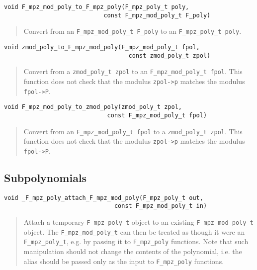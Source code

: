 \documentclass[a4paper,10pt]{article}
\newcommand{\code}{\lstinline}
\begin{document}
\begin{lstlisting}
void F_mpz_mod_poly_to_F_mpz_poly(F_mpz_poly_t poly, 
                            const F_mpz_mod_poly_t F_poly)
\end{lstlisting}
\begin{quote}
Convert from an \code{F_mpz_mod_poly_t F_poly} to an \code{F_mpz_poly_t poly}. 
\end{quote}

\begin{lstlisting}
void zmod_poly_to_F_mpz_mod_poly(F_mpz_mod_poly_t fpol,
                                   const zmod_poly_t zpol)
\end{lstlisting}
\begin{quote}
Convert from a \code{zmod_poly_t zpol} to an \code{F_mpz_mod_poly_t fpol}. This function does not
check that the modulus \code{zpol->p} matches the modulus \code{fpol->P}.
\end{quote}

\begin{lstlisting}
void F_mpz_mod_poly_to_zmod_poly(zmod_poly_t zpol, 
                             const F_mpz_mod_poly_t fpol)
\end{lstlisting}
\begin{quote}
Convert from an \code{F_mpz_mod_poly_t fpol} to a \code{zmod_poly_t zpol}. This function does not
check that the modulus \code{zpol->p} matches the modulus \code{fpol->P}.
\end{quote}

\subsection{Subpolynomials}

\begin{lstlisting}
void _F_mpz_poly_attach_F_mpz_mod_poly(F_mpz_poly_t out, 
                               const F_mpz_mod_poly_t in)
\end{lstlisting}
\begin{quote}
Attach a temporary \code{F_mpz_poly_t} object to an existing \code{F_mpz_mod_poly_t} object. The 
\code{F_mpz_mod_poly_t} can then be treated as though it were an \code{F_mpz_poly_t}, e.g. by 
passing it to \code{F_mpz_poly} functions. Note that such manipulation should not change the contents
of the polynomial, i.e. the alias should be passed only as the input to \code{F_mpz_poly} functions.
\end{quote}
\end{document}
